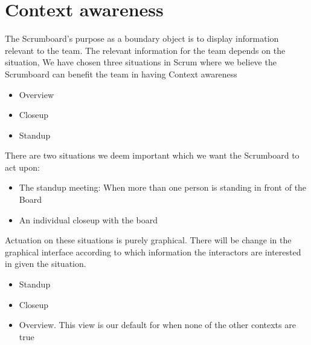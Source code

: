 \documentclass[../report.tex]{subfiles}
\begin{document}






\section{Context awareness}

The Scrumboard's purpose as a boundary object is to display information relevant to the team. The relevant information for the team depends on the situation, 
We have chosen three situations in Scrum where we believe the Scrumboard can benefit the team in having Context awareness

\begin{itemize}
\item Overview
\item Closeup
\item Standup
\end{itemize}

There are two situations we deem important which we want the Scrumboard to act upon:

\begin{itemize}
\item The standup meeting: When more than one person is standing in front of the Board
\item An individual closeup with the board
\end{itemize}

Actuation on these situations is purely graphical. There will be change in the graphical interface according to which information the interactors are interested in given the situation.

\begin{itemize}
\item Standup
\item Closeup
\item Overview. This view is our default for when none of the other contexts are true
\end{itemize}


\end{document}

